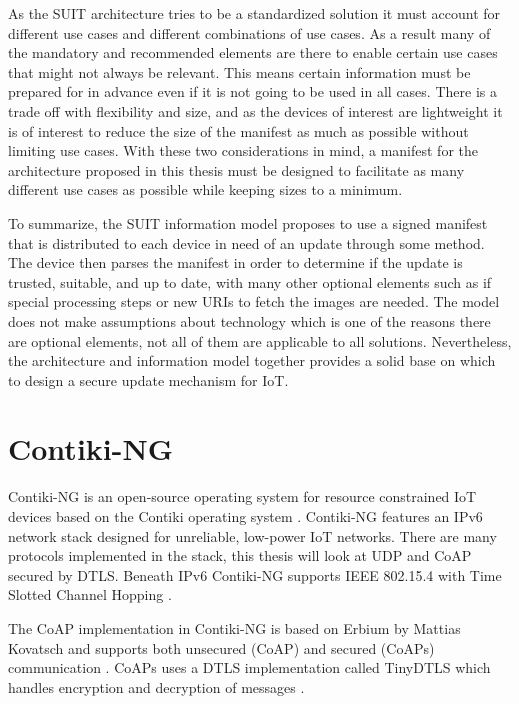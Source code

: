 \documentclass[0-thesis.tex]{subfiles}
\begin{document}
As the SUIT architecture tries to be a standardized solution it must account for different
use cases and different combinations of use cases. As a result many of the mandatory and
recommended elements are there to enable certain use cases that might not always be
relevant. This means certain information must be prepared for in advance even if it is not
going to be used in all cases. There is a trade off with flexibility and size, and as the
devices of interest are lightweight it is of interest to reduce the size of the manifest
as much as possible without limiting use cases. With these two considerations in mind, a
manifest for the architecture proposed in this thesis must be designed to facilitate as
many different use cases as possible while keeping sizes to a minimum.

To summarize, the SUIT information model proposes to use a signed manifest that is
distributed to each device in need of an update through some method. The device then
parses the manifest in order to determine if the update is trusted, suitable, and up to
date, with many other optional elements such as if special processing steps or new URIs to
fetch the images are needed. The model does not make assumptions about technology which is
one of the reasons there are optional elements, not all of them are applicable to all
solutions. Nevertheless, the architecture and information model together provides a solid
base on which to design a secure update mechanism for IoT.

\section{Contiki-NG}
\label{sec:contiki-ng}
Contiki-NG is an open-source operating system for resource constrained IoT devices based
on the Contiki operating system \parencite{contiki-ng-github, contiki-github}. Contiki-NG
features an IPv6 network stack designed for unreliable, low-power IoT networks. There are
many protocols implemented in the stack, this thesis will look at UDP and CoAP secured by
DTLS. Beneath IPv6 Contiki-NG supports IEEE 802.15.4 with Time Slotted Channel Hopping
\parencite{ieee-802.15.4}.

The CoAP implementation in Contiki-NG is based on Erbium by Mattias Kovatsch and supports
both unsecured (CoAP) and secured (CoAPs) communication \parencite{low-power-coap}. CoAPs
uses a DTLS implementation called TinyDTLS which handles encryption and decryption of
messages \parencite{tinydtls-github}.
\end{document}
